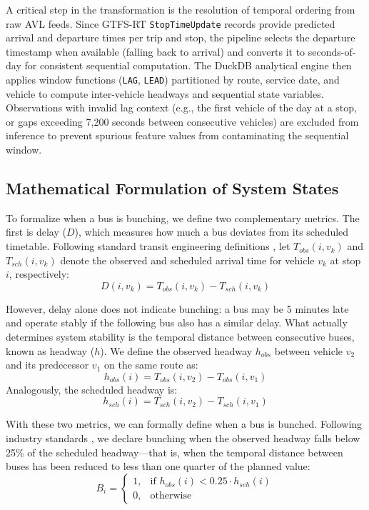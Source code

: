 \documentclass[fleqn,10pt,lineno]{wlpeerj}
\begin{document}
A critical step in the transformation is the resolution of temporal ordering from raw AVL feeds. Since GTFS-RT \texttt{StopTimeUpdate} records provide predicted arrival and departure times per trip and stop, the pipeline selects the departure timestamp when available (falling back to arrival) and converts it to seconds-of-day for consistent sequential computation. The DuckDB analytical engine then applies window functions (\texttt{LAG}, \texttt{LEAD}) partitioned by route, service date, and vehicle to compute inter-vehicle headways and sequential state variables. Observations with invalid lag context (e.g., the first vehicle of the day at a stop, or gaps exceeding 7{,}200 seconds between consecutive vehicles) are excluded from inference to prevent spurious feature values from contaminating the sequential window.

\subsection{Mathematical Formulation of System States}

To formalize when a bus is bunching, we define two complementary metrics. The first is delay
($D$), which measures how much a bus deviates from its scheduled timetable. Following standard transit engineering definitions \citep{37}, let $T_{obs}(i,
v_k)$ and $T_{sch}(i, v_k)$ denote the observed and scheduled arrival time for vehicle $v_k$
at stop $i$, respectively:
\begin{equation}
  D(i, v_k) = T_{obs}(i, v_k) - T_{sch}(i, v_k)
\end{equation}

However, delay alone does not indicate bunching: a bus may be 5 minutes late and operate
stably if the following bus also has a similar delay. What actually determines system stability
is the temporal distance between consecutive buses, known as headway ($h$). We define the
observed headway $h_{obs}$ between vehicle $v_2$ and its predecessor $v_1$ on the same route
as:
\begin{equation}
  h_{obs}(i) = T_{obs}(i, v_2) - T_{obs}(i, v_1)
\end{equation}
Analogously, the scheduled headway is:
\begin{equation}
  h_{sch}(i) = T_{sch}(i, v_2) - T_{sch}(i, v_1)
\end{equation}

With these two metrics, we can formally define when a bus is bunched. Following industry
standards \citep{37}, we declare bunching when the observed headway falls below 25\% of the
scheduled headway---that is, when the temporal distance between buses has been reduced to less
than one quarter of the planned value:
\begin{equation}
  B_i =
  \begin{cases}
    1, & \text{if } h_{obs}(i) < 0.25 \cdot h_{sch}(i) \\
    0, & \text{otherwise}
  \end{cases}
\end{equation}
\end{document}
